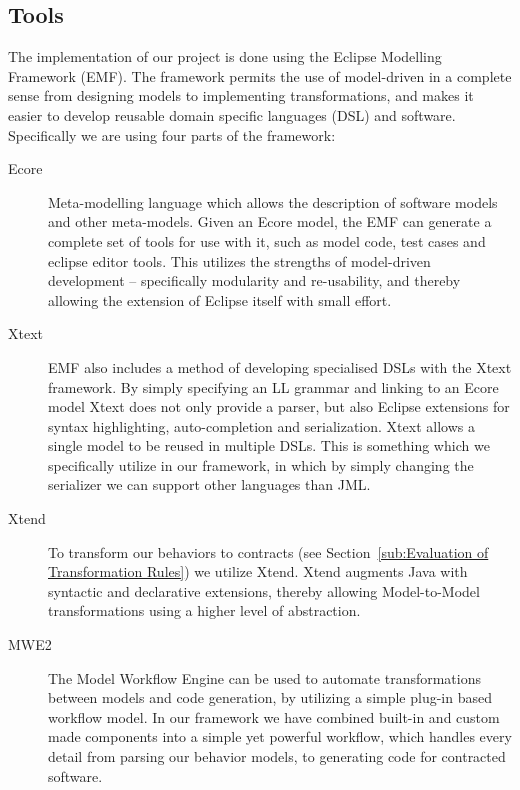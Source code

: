 \subsection{Tools}
The implementation of our project is done using the Eclipse Modelling Framework (EMF).
The framework permits the use of model-driven in a complete sense from designing models to implementing transformations, and makes
it easier to develop reusable domain specific languages (DSL) and software. Specifically we are using four parts of the framework:
\begin{description}
\item[Ecore] Meta-modelling language which allows the description of software models and other meta-models. Given an Ecore model, the EMF can
  generate a complete set of tools for use with it, such as model code, test cases and eclipse editor tools. This utilizes the strengths
  of model-driven development -- specifically modularity and re-usability, and thereby allowing the extension of Eclipse itself with small effort.
\item[Xtext] EMF also includes a method of developing specialised DSLs with the Xtext framework. By simply specifying an LL grammar and linking to an Ecore model
  Xtext does not only provide a parser, but also Eclipse extensions for syntax highlighting, auto-completion and serialization.
  Xtext allows a single model to be reused in multiple DSLs. This is something which we specifically utilize in our framework,
  in which by simply changing the serializer we can support other languages than JML.
\item[Xtend] To transform our behaviors to contracts (see Section~\ref{sub:Evaluation of Transformation Rules}) we utilize Xtend.
  Xtend augments Java with syntactic and declarative extensions, thereby allowing Model-to-Model transformations using a higher level of abstraction.
\item[MWE2] The Model Workflow Engine can be used to automate transformations between models and code generation, by utilizing a simple plug-in based
  workflow model. In our framework we have combined built-in and custom made components into a simple yet powerful workflow, which handles every detail
  from parsing our behavior models, to generating code for contracted software.
\end{description}
